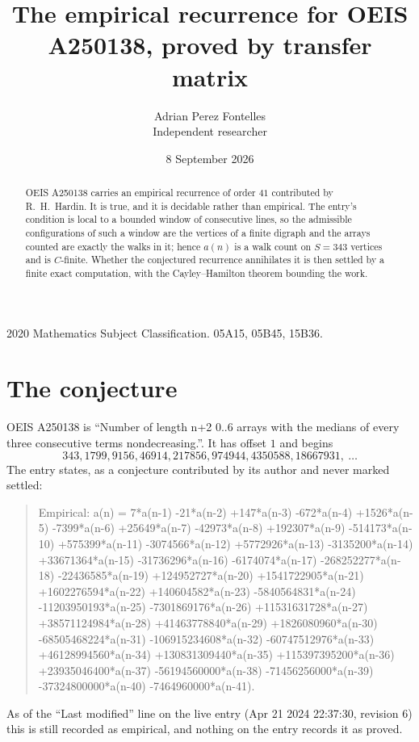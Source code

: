 \documentclass[11pt,a4paper]{article}
\title{The empirical recurrence for OEIS A250138, proved by transfer matrix}
\author{Adrian Perez Fontelles\\ \small Independent researcher}
\date{8 September 2026}
\theoremstyle{plain}
\theoremstyle{definition}
\begin{document}
\maketitle

\begin{abstract}
OEIS A250138 carries an empirical recurrence of order $41$ contributed by R.~H.~Hardin. It is
true, and it is decidable rather than empirical. The entry's condition is local to a bounded window of consecutive lines, so
the admissible configurations of such a window are the vertices of a finite digraph and the
arrays counted are exactly the walks in it; hence $a(n)$ is a walk count on $S=343$ vertices
and is $C$-finite. Whether the conjectured recurrence annihilates it is then settled by a
finite exact computation, with the Cayley--Hamilton theorem bounding the work.
\end{abstract}

\noindent\small 2020 Mathematics Subject Classification. 05A15, 05B45, 15B36.\normalsize

\section{The conjecture}

OEIS A250138 is ``Number of length n+2 0..6 arrays with the medians of every three consecutive terms nondecreasing.''. It has offset $1$ and begins
\[
343, 1799, 9156, 46914, 217856, 974944, 4350588, 18667931,\ \dots
\]
The entry states, as a conjecture contributed by its author and never marked settled:
\begin{quote}
Empirical: a(n) = 7*a(n-1) -21*a(n-2) +147*a(n-3) -672*a(n-4) +1526*a(n-5) -7399*a(n-6) +25649*a(n-7) -42973*a(n-8) +192307*a(n-9) -514173*a(n-10) +575399*a(n-11) -3074566*a(n-12) +5772926*a(n-13) -3135200*a(n-14) +33671364*a(n-15) -31736296*a(n-16) -6174074*a(n-17) -268252277*a(n-18) -22436585*a(n-19) +124952727*a(n-20) +1541722905*a(n-21) +1602276594*a(n-22) +140604582*a(n-23) -5840564831*a(n-24) -11203950193*a(n-25) -7301869176*a(n-26) +11531631728*a(n-27) +38571124984*a(n-28) +41463778840*a(n-29) +1826080960*a(n-30) -68505468224*a(n-31) -106915234608*a(n-32) -60747512976*a(n-33) +46128994560*a(n-34) +130831309440*a(n-35) +115397395200*a(n-36) +23935046400*a(n-37) -56194560000*a(n-38) -71456256000*a(n-39) -37324800000*a(n-40) -7464960000*a(n-41).
\end{quote}
As of the ``Last modified'' line on the live entry (Apr 21 2024 22:37:30, revision 6) this is still
recorded as empirical, and nothing on the entry records it as proved.
\end{document}
